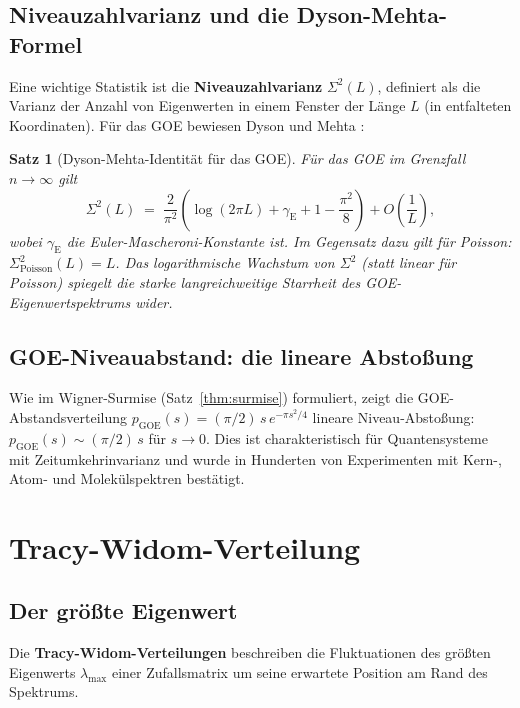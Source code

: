 \documentclass[12pt,a4paper]{amsart}
\newtheorem{theorem}{Satz}[section]
\theoremstyle{definition}
\theoremstyle{remark}
\begin{document}
\subsection{Niveauzahlvarianz und die Dyson-Mehta-Formel}

Eine wichtige Statistik ist die \textbf{Niveauzahlvarianz} $\Sigma^2(L)$,
definiert als die Varianz der Anzahl von Eigenwerten in einem Fenster der
Länge $L$ (in entfalteten Koordinaten). Für das GOE bewiesen Dyson und
Mehta \cite{Mehta2004}:

\begin{theorem}[Dyson-Mehta-Identität für das GOE]
\label{thm:dysonmehta}
Für das GOE im Grenzfall $n \to \infty$ gilt
\[
  \Sigma^2(L) \;=\; \frac{2}{\pi^2}\left(\log(2\pi L) + \gamma_{\mathrm{E}} + 1 - \frac{\pi^2}{8}\right)
  + O\!\left(\frac{1}{L}\right),
\]
wobei $\gamma_{\mathrm{E}}$ die Euler-Mascheroni-Konstante ist. Im Gegensatz dazu
gilt für Poisson: $\Sigma^2_{\mathrm{Poisson}}(L) = L$.
Das logarithmische Wachstum von $\Sigma^2$ (statt linear für Poisson) spiegelt
die starke \emph{langreichweitige Starrheit} des GOE-Eigenwertspektrums wider.
\end{theorem}

\subsection{GOE-Niveauabstand: die lineare Abstoßung}

Wie im Wigner-Surmise (Satz~\ref{thm:surmise}) formuliert, zeigt die GOE-Abstandsverteilung
$p_{\mathrm{GOE}}(s) = (\pi/2)\,s\,e^{-\pi s^2/4}$ lineare Niveau-Abstoßung:
$p_{\mathrm{GOE}}(s) \sim (\pi/2)\,s$ für $s \to 0$.
Dies ist charakteristisch für Quantensysteme mit Zeitumkehrinvarianz und
wurde in Hunderten von Experimenten mit Kern-, Atom- und Molekülspektren bestätigt.

\section{Tracy-Widom-Verteilung}
\label{sec:tracywidom}

\subsection{Der größte Eigenwert}

Die \textbf{Tracy-Widom-Verteilungen} beschreiben die Fluktuationen des
größten Eigenwerts $\lambda_{\max}$ einer Zufallsmatrix um seine erwartete
Position am Rand des Spektrums.
\end{document}
